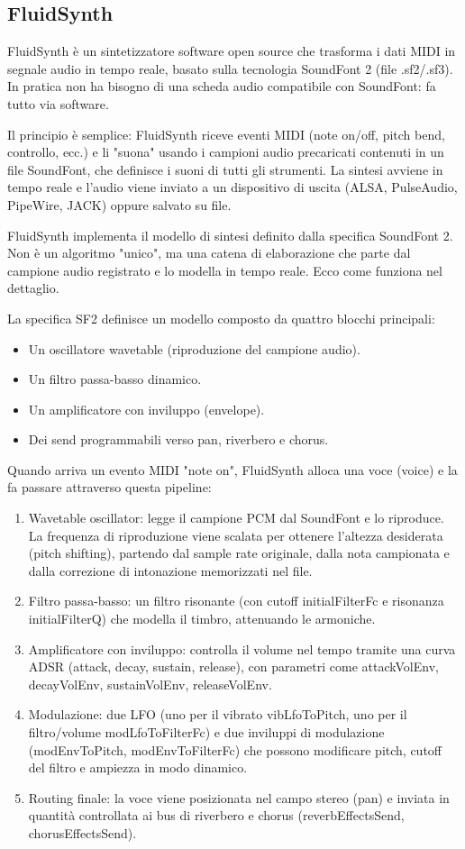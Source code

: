 \subsection{FluidSynth}
FluidSynth è un sintetizzatore software open source che trasforma i dati MIDI in segnale audio in tempo reale, basato sulla tecnologia SoundFont 2 (file .sf2/.sf3). In pratica non ha bisogno di una scheda audio compatibile con SoundFont: fa tutto via software.


Il principio è semplice: FluidSynth riceve eventi MIDI (note on/off, pitch bend, controllo, ecc.) e li "suona" usando i campioni audio precaricati contenuti in un file SoundFont, che definisce i suoni di tutti gli strumenti. La sintesi avviene in tempo reale e l'audio viene inviato a un dispositivo di uscita (ALSA, PulseAudio, PipeWire, JACK) oppure salvato su file.

FluidSynth implementa il modello di sintesi definito dalla specifica SoundFont 2. Non è un algoritmo "unico", ma una catena di elaborazione che parte dal campione audio registrato e lo modella in tempo reale. Ecco come funziona nel dettaglio.

La specifica SF2 definisce un modello composto da quattro blocchi principali:
\begin{itemize}
\item Un oscillatore wavetable (riproduzione del campione audio).
\item Un filtro passa-basso dinamico.
\item Un amplificatore con inviluppo (envelope).
\item Dei send programmabili verso pan, riverbero e chorus.

\end{itemize}

Quando arriva un evento MIDI "note on", FluidSynth alloca una voce (voice) e la fa passare attraverso questa pipeline:
\begin{enumerate}
    \item Wavetable oscillator: legge il campione PCM dal SoundFont e lo riproduce. La frequenza di riproduzione viene scalata per ottenere l'altezza desiderata (pitch shifting), partendo dal sample rate originale, dalla nota campionata e dalla correzione di intonazione memorizzati nel file.
    \item Filtro passa-basso: un filtro risonante (con cutoff initialFilterFc e risonanza initialFilterQ) che modella il timbro, attenuando le armoniche.
    \item Amplificatore con inviluppo: controlla il volume nel tempo tramite una curva ADSR (attack, decay, sustain, release), con parametri come attackVolEnv, decayVolEnv, sustainVolEnv, releaseVolEnv.
    \item Modulazione: due LFO (uno per il vibrato vibLfoToPitch, uno per il filtro/volume modLfoToFilterFc) e due inviluppi di modulazione (modEnvToPitch, modEnvToFilterFc) che possono modificare pitch, cutoff del filtro e ampiezza in modo dinamico.
    \item Routing finale: la voce viene posizionata nel campo stereo (pan) e inviata in quantità controllata ai bus di riverbero e chorus (reverbEffectsSend, chorusEffectsSend).
\end{enumerate}

